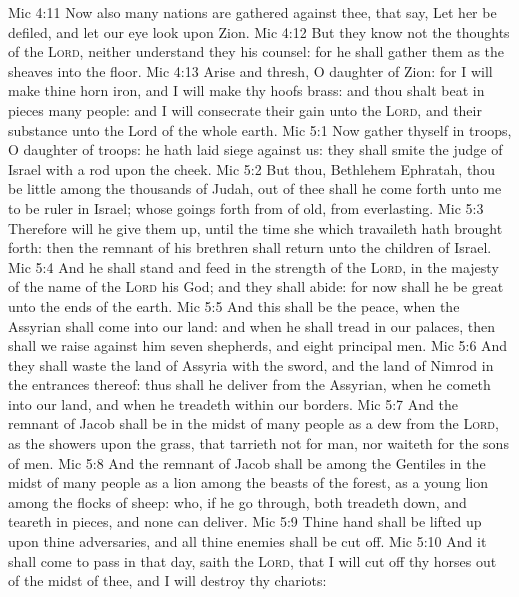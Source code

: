 \vs Mic 4:11 Now also many nations are gathered against thee, that say, Let her be defiled, and let our eye look upon Zion.
\vs Mic 4:12 But they know not the thoughts of the \textsc{Lord}, neither understand they his counsel: for he shall gather them as the sheaves into the floor.
\vs Mic 4:13 Arise and thresh, O daughter of Zion: for I will make thine horn iron, and I will make thy hoofs brass: and thou shalt beat in pieces many people: and I will consecrate their gain unto the \textsc{Lord}, and their substance unto the Lord of the whole earth.
\vs Mic 5:1 Now gather thyself in troops, O daughter of troops: he hath laid siege against us: they shall smite the judge of Israel with a rod upon the cheek.
\vs Mic 5:2 But thou, Bethlehem Ephratah,  thou be little among the thousands of Judah,  out of thee shall he come forth unto me  to be ruler in Israel; whose goings forth  from of old, from everlasting.
\vs Mic 5:3 Therefore will he give them up, until the time  she which travaileth hath brought forth: then the remnant of his brethren shall return unto the children of Israel.
\vs Mic 5:4 And he shall stand and feed in the strength of the \textsc{Lord}, in the majesty of the name of the \textsc{Lord} his God; and they shall abide: for now shall he be great unto the ends of the earth.
\vs Mic 5:5 And this  shall be the peace, when the Assyrian shall come into our land: and when he shall tread in our palaces, then shall we raise against him seven shepherds, and eight principal men.
\vs Mic 5:6 And they shall waste the land of Assyria with the sword, and the land of Nimrod in the entrances thereof: thus shall he deliver  from the Assyrian, when he cometh into our land, and when he treadeth within our borders.
\vs Mic 5:7 And the remnant of Jacob shall be in the midst of many people as a dew from the \textsc{Lord}, as the showers upon the grass, that tarrieth not for man, nor waiteth for the sons of men.
\vs Mic 5:8 And the remnant of Jacob shall be among the Gentiles in the midst of many people as a lion among the beasts of the forest, as a young lion among the flocks of sheep: who, if he go through, both treadeth down, and teareth in pieces, and none can deliver.
\vs Mic 5:9 Thine hand shall be lifted up upon thine adversaries, and all thine enemies shall be cut off.
\vs Mic 5:10 And it shall come to pass in that day, saith the \textsc{Lord}, that I will cut off thy horses out of the midst of thee, and I will destroy thy chariots:

